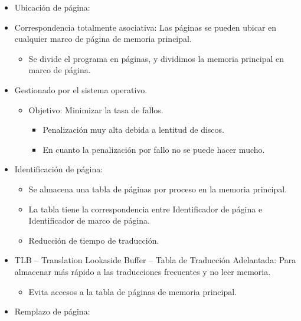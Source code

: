 \documentclass[12pt, twoside, openright]{report} %
\begin{document}
  \begin{itemize}
  \item
    Ubicación de página:
  \item
    Correspondencia totalmente asociativa: Las páginas se pueden ubicar
    en cualquier marco de página de memoria principal.

    \begin{itemize}
    
    \item
      Se divide el programa en páginas, y dividimos la memoria principal
      en marco de página.
    \end{itemize}
  \item
    Gestionado por el sistema operativo.

    \begin{itemize}
    
    \item
      Objetivo: Minimizar la tasa de fallos.

      \begin{itemize}
      
      \item
        Penalización muy alta debida a lentitud de discos.
      \item
        En cuanto la penalización por fallo no se puede hacer mucho.
      \end{itemize}
    \end{itemize}
  \item
    Identificación de página:

    \begin{itemize}
    \item
      Se almacena una tabla de páginas por proceso en la memoria
      principal.
    \item
      La tabla tiene la correspondencia entre Identificador de página e
      Identificador de marco de página.

    \item
      Reducción de tiempo de traducción.
    \end{itemize}
  \item
    TLB -- Translation Lookaside Buffer -- Tabla de Traducción
    Adelantada: Para almacenar más rápido a las traducciones frecuentes y
    no leer memoria.

    \begin{itemize}
    
    \item
      Evita accesos a la tabla de páginas de memoria principal.
    \end{itemize}
  \item
    Remplazo de página:


\end{itemize}
\end{document}
